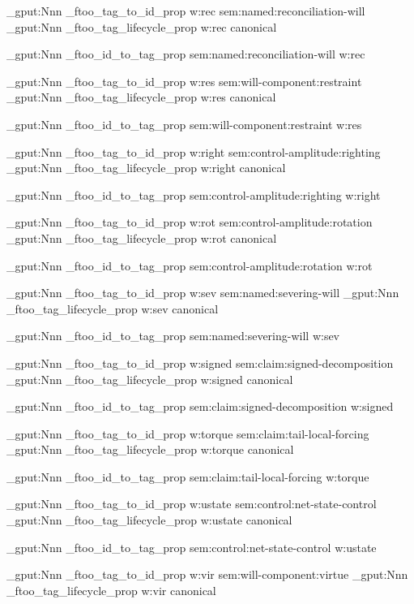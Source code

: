 \prop_gput:Nnn \g_ftoo_tag_to_id_prop { w:rec } { sem:named:reconciliation-will }
\prop_gput:Nnn \g_ftoo_tag_lifecycle_prop { w:rec } { canonical }

\prop_gput:Nnn \g_ftoo_id_to_tag_prop { sem:named:reconciliation-will } { w:rec }


\prop_gput:Nnn \g_ftoo_tag_to_id_prop { w:res } { sem:will-component:restraint }
\prop_gput:Nnn \g_ftoo_tag_lifecycle_prop { w:res } { canonical }

\prop_gput:Nnn \g_ftoo_id_to_tag_prop { sem:will-component:restraint } { w:res }


\prop_gput:Nnn \g_ftoo_tag_to_id_prop { w:right } { sem:control-amplitude:righting }
\prop_gput:Nnn \g_ftoo_tag_lifecycle_prop { w:right } { canonical }

\prop_gput:Nnn \g_ftoo_id_to_tag_prop { sem:control-amplitude:righting } { w:right }


\prop_gput:Nnn \g_ftoo_tag_to_id_prop { w:rot } { sem:control-amplitude:rotation }
\prop_gput:Nnn \g_ftoo_tag_lifecycle_prop { w:rot } { canonical }

\prop_gput:Nnn \g_ftoo_id_to_tag_prop { sem:control-amplitude:rotation } { w:rot }


\prop_gput:Nnn \g_ftoo_tag_to_id_prop { w:sev } { sem:named:severing-will }
\prop_gput:Nnn \g_ftoo_tag_lifecycle_prop { w:sev } { canonical }

\prop_gput:Nnn \g_ftoo_id_to_tag_prop { sem:named:severing-will } { w:sev }


\prop_gput:Nnn \g_ftoo_tag_to_id_prop { w:signed } { sem:claim:signed-decomposition }
\prop_gput:Nnn \g_ftoo_tag_lifecycle_prop { w:signed } { canonical }

\prop_gput:Nnn \g_ftoo_id_to_tag_prop { sem:claim:signed-decomposition } { w:signed }


\prop_gput:Nnn \g_ftoo_tag_to_id_prop { w:torque } { sem:claim:tail-local-forcing }
\prop_gput:Nnn \g_ftoo_tag_lifecycle_prop { w:torque } { canonical }

\prop_gput:Nnn \g_ftoo_id_to_tag_prop { sem:claim:tail-local-forcing } { w:torque }


\prop_gput:Nnn \g_ftoo_tag_to_id_prop { w:ustate } { sem:control:net-state-control }
\prop_gput:Nnn \g_ftoo_tag_lifecycle_prop { w:ustate } { canonical }

\prop_gput:Nnn \g_ftoo_id_to_tag_prop { sem:control:net-state-control } { w:ustate }


\prop_gput:Nnn \g_ftoo_tag_to_id_prop { w:vir } { sem:will-component:virtue }
\prop_gput:Nnn \g_ftoo_tag_lifecycle_prop { w:vir } { canonical }

